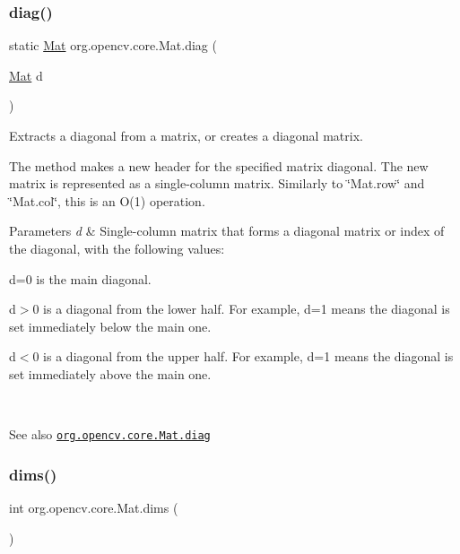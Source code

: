 \subsubsection{\texorpdfstring{diag()}{diag()}\hspace{0.1cm}{\footnotesize\ttfamily [3/3]}}
{\footnotesize\ttfamily static \mbox{\hyperlink{classorg_1_1opencv_1_1core_1_1_mat}{Mat}} org.\+opencv.\+core.\+Mat.\+diag (\begin{DoxyParamCaption}\item[{\mbox{\hyperlink{classorg_1_1opencv_1_1core_1_1_mat}{Mat}}}]{d }\end{DoxyParamCaption})\hspace{0.3cm}{\ttfamily [static]}}

Extracts a diagonal from a matrix, or creates a diagonal matrix.

The method makes a new header for the specified matrix diagonal. The new matrix is represented as a single-\/column matrix. Similarly to \char`\"{}\+Mat.\+row\char`\"{} and \char`\"{}\+Mat.\+col\char`\"{}, this is an O(1) operation.


\begin{DoxyParams}{Parameters}
{\em d} & Single-\/column matrix that forms a diagonal matrix or index of the diagonal, with the following values\+: 
\begin{DoxyItemize}
\item d=0 is the main diagonal. 
\item d$>$0 is a diagonal from the lower half. For example, {\ttfamily d=1} means the diagonal is set immediately below the main one. 
\item d$<$0 is a diagonal from the upper half. For example, {\ttfamily d=1} means the diagonal is set immediately above the main one. 
\end{DoxyItemize}\\
\hline
\end{DoxyParams}
\begin{DoxySeeAlso}{See also}
\href{http://docs.opencv.org/modules/core/doc/basic_structures.html#mat-diag}{\tt org.\+opencv.\+core.\+Mat.\+diag} 
\end{DoxySeeAlso}
\mbox{\label{classorg_1_1opencv_1_1core_1_1_mat_a9da03786400df5d6ef7ff4217f9a93f9}} 
\subsubsection{\texorpdfstring{dims()}{dims()}}
{\footnotesize\ttfamily int org.\+opencv.\+core.\+Mat.\+dims (\begin{DoxyParamCaption}{ }\end{DoxyParamCaption})}

